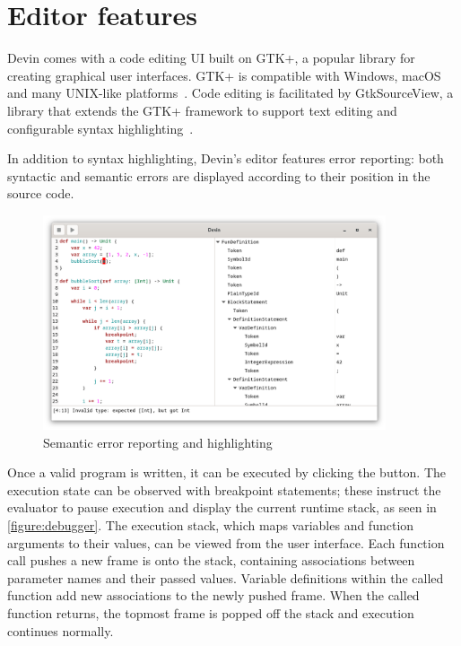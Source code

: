 \documentclass[UdineBachThesis,american,11pt]{PhdThesis}
\begin{document}
  \section{Editor features}
  \label{section:editor-features}

  Devin comes with a code editing UI built on GTK+, a popular library for
  creating graphical user interfaces. GTK+ is compatible with Windows, macOS and
  many UNIX-like platforms~\cite{gtk+}. Code editing is facilitated by
  GtkSourceView, a library that extends the GTK+ framework to support text
  editing and configurable syntax highlighting~\cite{gtksourceview}.

  In addition to syntax highlighting, Devin's editor features error reporting:
  both syntactic and semantic errors are displayed according to their position
  in the source code.

  \begin{figure}[H]
    \centering
    \includegraphics[width=0.9\textwidth]{4.png}
    \caption{Semantic error reporting and highlighting}
  \end{figure}

  \pagebreak

  Once a valid program is written, it can be executed by clicking the
  {\blacktriangleright} button. The execution state can be observed with
  breakpoint statements; these instruct the evaluator to pause execution and
  display the current runtime stack, as seen in \autoref{figure:debugger}. The
  execution stack, which maps variables and function arguments to their values,
  can be viewed from the user interface. Each function call pushes a new frame
  is onto the stack, containing associations between parameter names and their
  passed values. Variable definitions within the called function add new
  associations to the newly pushed frame. When the called function returns, the
  topmost frame is popped off the stack and execution continues normally.
\end{document}
